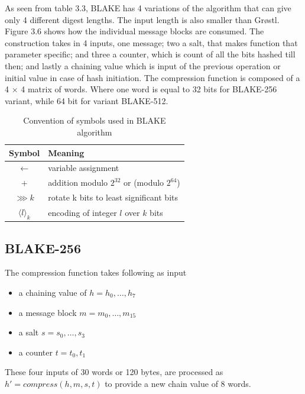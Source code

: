 As seen from table 3.3, BLAKE has 4 variations of the algorithm that can give only 4 different digest lengths. The input
length is also smaller than Gr{\o}stl. Figure 3.6 shows how the individual message blocks are consumed. The construction
takes in 4 inputs, one message; two a salt, that makes function that parameter specific; and three a counter, which is 
count of all the bits hashed till then; and lastly a chaining value which is input of the previous operation or initial
value in case of hash initiation. The compression function is composed of a 4 $\times$ 4 matrix of words. Where one word is 
equal to 32 bits for BLAKE-256 variant, while 64 bit for variant BLAKE-512.

\begin{table}[h]
  \begin{center}
    \begin{tabular}{ c l } \hline
      Symbol                  & Meaning \\ \hline
      $\gets$                 & variable assignment \\
      $+$                     & addition modulo $2^{32}$ or (modulo $2^{64}$) \\
      $\ggg k$                & rotate k bits to least significant bits \\
      $\langle l \rangle_{k}$ & encoding of integer $l$ over $k$ bits \\ \hline
    \end{tabular}
    \caption{Convention of symbols used in BLAKE algorithm}
  \end{center}
\end{table}

\subsection{ BLAKE-256 }

The compression function takes following as input
\begin{itemize}
  \item a chaining value of $h = h_{0},\dots, h_{7}$
  \item a message block $m = m_{0},\dots, m_{15}$
  \item a salt $s = s_{0},\dots, s_{3}$
  \item a counter $t = t_{0}, t_{1}$
\end{itemize}
These four inputs of 30 words or 120 bytes, are processed as $h' = compress(h, m, s, t)$ to provide a new
chain value of 8 words.

